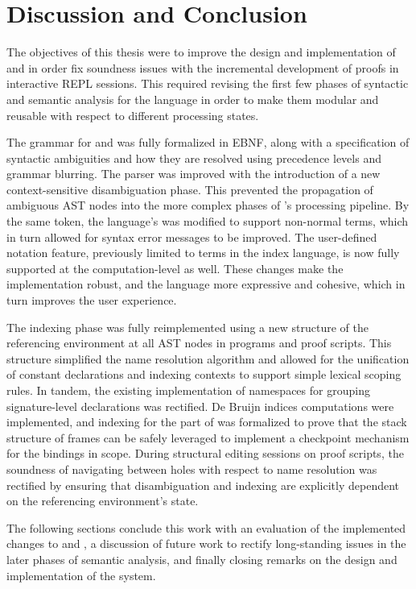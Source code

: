 \chapter{Discussion and Conclusion}\label{chapter:conclusion}

The objectives of this thesis were to improve the design and implementation of \Beluga and \Harpoon in order fix soundness issues with the incremental development of proofs in interactive \ac{REPL} sessions.
This required revising the first few phases of syntactic and semantic analysis for the language in order to make them modular and reusable with respect to different processing states.

The grammar for \Beluga and \Harpoon was fully formalized in \ac{EBNF}, along with a specification of syntactic ambiguities and how they are resolved using precedence levels and grammar blurring.
The parser was improved with the introduction of a new context-sensitive disambiguation phase.
This prevented the propagation of ambiguous \ac{AST} nodes into the more complex phases of \Beluga's processing pipeline.
By the same token, the language's was modified to support non-normal terms, which in turn allowed for syntax error messages to be improved.
The user-defined notation feature, previously limited to terms in the index language, is now fully supported at the computation-level as well.
These changes make the implementation robust, and the language more expressive and cohesive, which in turn improves the user experience.

The indexing phase was fully reimplemented using a new structure of the referencing environment at all \ac{AST} nodes in \Beluga programs and \Harpoon proof scripts.
This structure simplified the name resolution algorithm and allowed for the unification of constant declarations and indexing contexts to support simple lexical scoping rules.
In tandem, the existing implementation of namespaces for grouping signature-level declarations was rectified.
De Bruijn indices computations were implemented, and indexing for the \LF part of \Beluga was formalized to prove that the stack structure of frames can be safely leveraged to implement a checkpoint mechanism for the bindings in scope.
During \Harpoon structural editing sessions on proof scripts, the soundness of navigating between holes with respect to name resolution was rectified by ensuring that disambiguation and indexing are explicitly dependent on the referencing environment's state.

The following sections conclude this work with an evaluation of the implemented changes to \Beluga and \Harpoon, a discussion of future work to rectify long-standing issues in the later phases of semantic analysis, and finally closing remarks on the design and implementation of the system.

